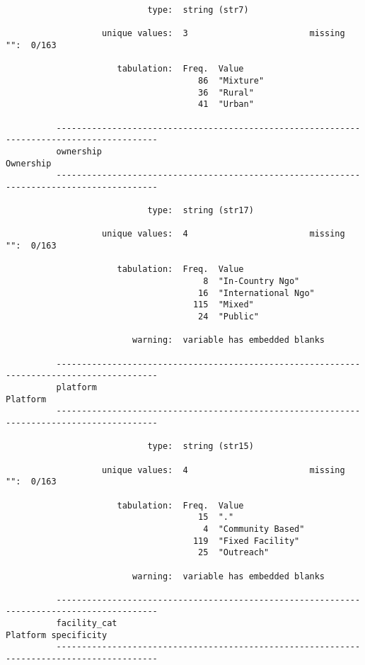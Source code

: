 \documentclass{article}
\begin{document}
\begin{verbatim}
                            type:  string (str7)
          
                   unique values:  3                        missing "":  0/163
          
                      tabulation:  Freq.  Value
                                      86  "Mixture"
                                      36  "Rural"
                                      41  "Urban"
          
          ------------------------------------------------------------------------------------------
          ownership                                                                        Ownership
          ------------------------------------------------------------------------------------------
          
                            type:  string (str17)
          
                   unique values:  4                        missing "":  0/163
          
                      tabulation:  Freq.  Value
                                       8  "In-Country Ngo"
                                      16  "International Ngo"
                                     115  "Mixed"
                                      24  "Public"
          
                         warning:  variable has embedded blanks
          
          ------------------------------------------------------------------------------------------
          platform                                                                          Platform
          ------------------------------------------------------------------------------------------
          
                            type:  string (str15)
          
                   unique values:  4                        missing "":  0/163
          
                      tabulation:  Freq.  Value
                                      15  "."
                                       4  "Community Based"
                                     119  "Fixed Facility"
                                      25  "Outreach"
          
                         warning:  variable has embedded blanks
          
          ------------------------------------------------------------------------------------------
          facility_cat                                                          Platform specificity
          ------------------------------------------------------------------------------------------
          

\end{verbatim}
\end{document}
